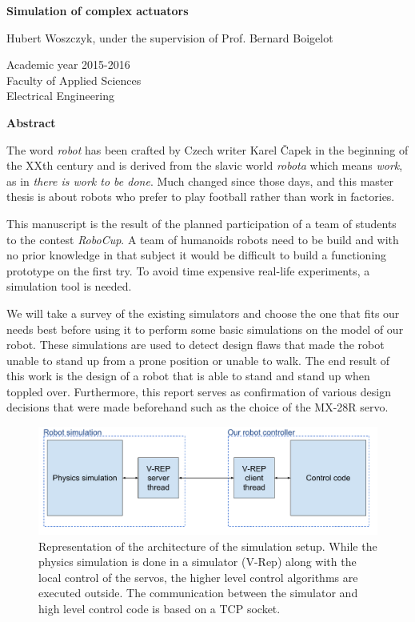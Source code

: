 \thispagestyle{empty}
\begin{center}
    \Large
    \textbf{Simulation of complex actuators}
    
    \vspace{0.4cm}
    \large
    Hubert Woszczyk, under the supervision of Prof. Bernard Boigelot
    
    \normalsize
    Academic year 2015-2016\\
    Faculty of Applied Sciences\\
    Electrical Engineering
    
    \vspace{0.9cm}
    \textbf{Abstract}
\end{center}
The word \emph{robot} has been crafted by Czech writer Karel Čapek in the beginning of the XXth century and is derived from the slavic world \emph{robota} which means \emph{work}, as in \emph{there is work to be done}. Much changed since those days, and this master thesis is about robots who prefer to play football rather than work in factories.

This manuscript is the result of the planned participation of a team of students to the contest \emph{RoboCup}. A team of humanoids robots need to be build and with no prior knowledge in that subject it would be difficult to build a functioning prototype on the first try. To avoid time expensive real-life experiments, a simulation tool is needed.

We will take a survey of the existing simulators and choose the one that fits our needs best before using it to perform some basic simulations on the model of our robot. These simulations are used to detect design flaws that made the robot unable to stand up from a prone position or unable to walk. The end result of this work is the design of a robot that is able to stand and stand up when toppled over. Furthermore, this report serves as confirmation of various design decisions that were made beforehand such as the choice of the MX-28R servo.
\clearpage

\thispagestyle{empty}
\vspace*{3cm}
\begin{figure}[htp]
\center
    \includegraphics[width = \textwidth]{figures/simulation_principles}
    \caption[]{Representation of the architecture of the simulation setup. While the physics simulation is done in a simulator (V-Rep) along with the local control of the servos, the higher level control algorithms are executed outside. The communication between the simulator and high level control code is based on a TCP socket.}
    \label{fig:abstract1}
\end{figure}

